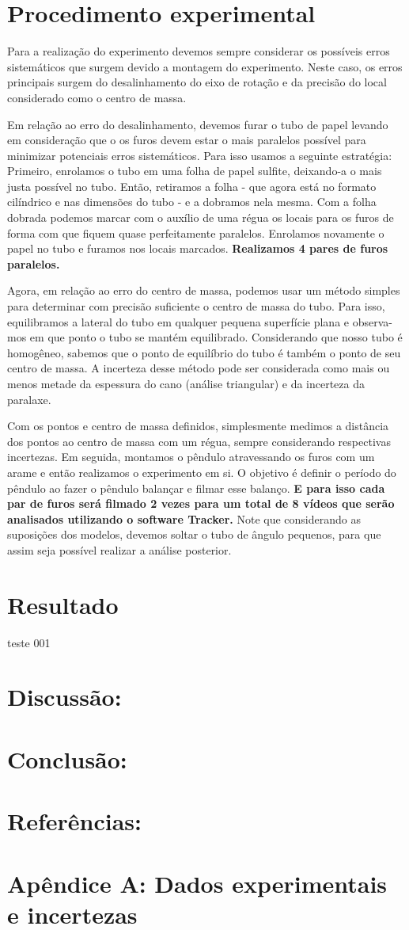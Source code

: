 \documentclass[a4paper]{report}
\begin{document}
\section*{Procedimento experimental}

\qquad Para a realização do experimento devemos sempre considerar os possíveis erros sistemáticos que surgem devido a montagem do experimento. Neste caso, os erros principais surgem do desalinhamento do eixo de rotação e da precisão do local considerado como o centro de massa.

\qquad Em relação ao erro do desalinhamento, devemos furar o tubo de papel levando em consideração que o os furos devem estar o mais paralelos possível para minimizar potenciais erros sistemáticos. Para isso usamos a seguinte estratégia: Primeiro, enrolamos o tubo em uma folha de papel sulfite, deixando-a o mais justa possível no tubo. Então, retiramos a folha - que agora está no formato cilíndrico e nas dimensões do tubo - e a dobramos nela mesma. Com a folha dobrada podemos marcar com o auxílio de uma régua os locais para os furos de forma com que fiquem quase perfeitamente paralelos. Enrolamos novamente o papel no tubo e furamos nos locais marcados.\textbf{ Realizamos 4 pares de furos paralelos.}

\qquad Agora, em relação ao erro do centro de massa, podemos usar um método simples para determinar com precisão suficiente o centro de massa do tubo. Para isso, equilibramos a lateral do tubo em qualquer pequena superfície plana e observa-mos em que ponto o tubo se mantém equilibrado. Considerando que nosso tubo é homogêneo, sabemos que o ponto de equilíbrio do tubo é também o ponto de seu centro de massa. A incerteza desse método pode ser considerada como mais ou menos metade da espessura do cano (análise triangular) e da incerteza da paralaxe.

\qquad Com os pontos e centro de massa definidos, simplesmente medimos a distância dos pontos ao centro de massa com um régua, sempre considerando respectivas incertezas. Em seguida, montamos o pêndulo atravessando os furos com um arame e então realizamos o experimento em si. O objetivo é definir o período do pêndulo ao fazer o pêndulo balançar e filmar esse balanço.\textbf{ E para isso cada par de furos será filmado 2 vezes para um total de 8 vídeos que serão analisados utilizando o software Tracker.} Note que considerando as suposições dos modelos, devemos soltar o tubo de ângulo pequenos, para que assim seja possível realizar a análise posterior.
\section*{Resultado}
\qquad teste 001
\section*{Discussão:}
\section*{Conclusão:}
\section*{Referências:}
\section*{Apêndice A: Dados experimentais e incertezas}
\end{document}
